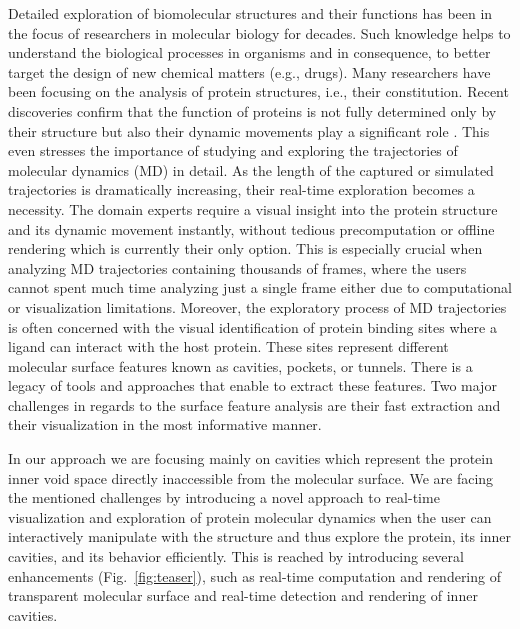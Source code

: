 
Detailed exploration of biomolecular structures and their functions has been in the focus of researchers in molecular biology for decades.
Such knowledge helps to understand the biological processes in organisms and in consequence, to better target the design of new chemical matters (e.g., drugs).
Many researchers have been focusing on the analysis of protein structures, i.e., their constitution. 
Recent discoveries confirm that the function of proteins is not fully determined only by their structure but also their dynamic movements play a significant role \cite{Hensen2012}.
This even stresses the importance of studying and exploring the trajectories of molecular dynamics (MD) in detail. 
As the length of the captured or simulated trajectories is dramatically increasing, their real-time exploration becomes a necessity. 
The domain experts require a visual insight into the protein structure and its dynamic movement instantly, without tedious precomputation or offline rendering which is currently their only option.
This is especially crucial when analyzing MD trajectories containing thousands of frames, where the users cannot spent much time analyzing just a single frame either due to computational or visualization limitations. 
Moreover, the exploratory process of MD trajectories is often concerned with the visual identification of protein binding sites where a ligand can interact with the host protein.
These sites represent different molecular surface features known as cavities, pockets, or tunnels.
There is a legacy of tools and approaches that enable to extract these features.
Two major challenges in regards to the surface feature analysis are their fast extraction and their visualization in the most informative manner. 

In our approach we are focusing mainly on cavities which represent the protein inner void space directly inaccessible from the molecular surface. 
We are facing the mentioned challenges by introducing a novel approach to real-time visualization and exploration of protein molecular dynamics when the user can interactively manipulate with the structure and thus explore the protein, its inner cavities, and its behavior efficiently. 
This is reached by introducing several enhancements (Fig.~\ref{fig:teaser}), such as real-time computation and rendering of transparent molecular surface and real-time detection and rendering of inner cavities.


